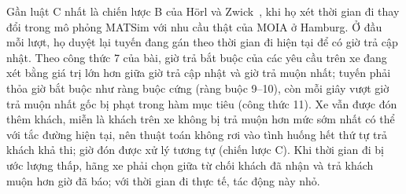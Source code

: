 Gần luật C nhất là chiến lược B của Hörl và Zwick~\cite{horl2022}, khi họ xét thời gian đi thay đổi trong mô phỏng
MATSim với nhu cầu thật của MOIA ở Hamburg. Ở đầu mỗi lượt, họ duyệt lại tuyến đang gán theo thời gian đi hiện tại để
có giờ trả cập nhật. Theo công thức 7 của bài, giờ trả bắt buộc của các yêu cầu trên xe đang xét bằng giá trị lớn hơn
giữa giờ trả cập nhật và giờ trả muộn nhất; tuyến phải thỏa giờ bắt buộc như ràng buộc cứng (ràng buộc 9--10), còn
mỗi giây vượt giờ trả muộn nhất gốc bị phạt trong hàm mục tiêu (công thức 11). Xe vẫn được đón thêm khách, miễn là
khách trên xe không bị trả muộn hơn mức sớm nhất có thể với tắc đường hiện tại, nên thuật toán không rơi vào tình huống
hết thứ tự trả khách khả thi; giờ đón được xử lý tương tự (chiến lược C). Khi thời gian đi bị ước lượng thấp, hãng xe
phải chọn giữa từ chối khách đã nhận và trả khách muộn hơn giờ đã báo; với thời gian đi thực tế, tác động này nhỏ.

